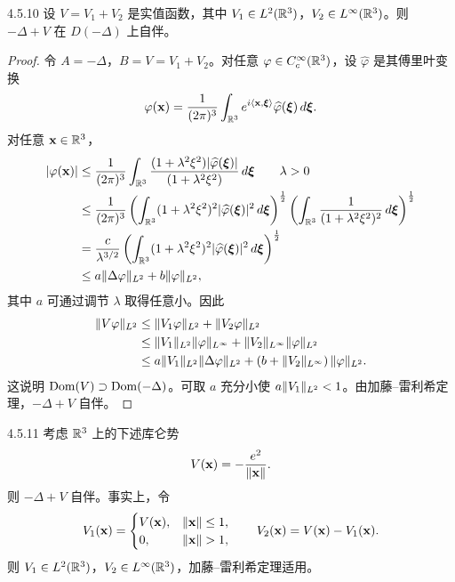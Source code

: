 \begin{proposition}{4.5.10}
  设 $V=V_1+V_2$ 是实值函数，其中 $V_1\in L^2(\mathbb{R}^3)$，$V_2\in L^\infty(\mathbb{R}^3)$。则 $-\Delta+V$ 在 $D(-\Delta)$ 上自伴。
\end{proposition}

\begin{proof}
  令 $A=-\Delta$，$B=V=V_1+V_2$。对任意 $\varphi\in C_c^\infty(\mathbb{R}^3)$，设 $\widehat{\varphi}$ 是其傅里叶变换
  \[
  \varphi(\mathbf{x})=\frac{1}{(2\pi)^3}\int_{\mathbb{R}^3}
  e^{i\langle\mathbf{x},\boldsymbol{\xi}\rangle}\widehat{\varphi}(\boldsymbol{\xi})\,d\boldsymbol{\xi}.
  \]
  对任意 $\mathbf{x}\in\mathbb{R}^3$，
  \begin{align*}
  \lvert \varphi(\mathbf{x})\rvert
  &\le\frac{1}{(2\pi)^3}\int_{\mathbb{R}^3}
  \frac{(1+\lambda^2\xi^2)\lvert \widehat{\varphi}(\boldsymbol{\xi})\rvert}{(1+\lambda^2\xi^2)}\,d\boldsymbol{\xi}
  \qquad\lambda>0\\
  &\le\frac{1}{(2\pi)^3}
  \left(\int_{\mathbb{R}^3}(1+\lambda^2\xi^2)^2\lvert \widehat{\varphi}(\boldsymbol{\xi})\rvert^2\,d\boldsymbol{\xi}\right)^{\frac12}
  \left(\int_{\mathbb{R}^3}\frac{1}{(1+\lambda^2\xi^2)^2}\,d\boldsymbol{\xi}\right)^{\frac12}\\
  &=\frac{c}{\lambda^{3/2}}
  \left(\int_{\mathbb{R}^3}(1+\lambda^2\xi^2)^2\lvert \widehat{\varphi}(\boldsymbol{\xi})\rvert^2\,d\boldsymbol{\xi}\right)^{\frac12}\\
  &\le a\lVert \Delta\varphi\rVert_{L^2}+b\lVert \varphi\rVert_{L^2},
  \end{align*}
  其中 $a$ 可通过调节 $\lambda$ 取得任意小。因此
  \begin{align*}
  \lVert V\varphi\rVert_{L^2}
  &\le\lVert V_1\varphi\rVert_{L^2}+\lVert V_2\varphi\rVert_{L^2}\\
  &\le\lVert V_1\rVert_{L^2}\lVert \varphi\rVert_{L^\infty}+\lVert V_2\rVert_{L^\infty}\lVert \varphi\rVert_{L^2}\\
  &\le a\lVert V_1\rVert_{L^2}\lVert \Delta\varphi\rVert_{L^2}
  +\left(b+\lVert V_2\rVert_{L^\infty}\right)\lVert \varphi\rVert_{L^2}.
  \end{align*}
  这说明 $\operatorname{Dom}(V)\supset\operatorname{Dom}(-\Delta)$。可取 $a$ 充分小使 $a\lVert V_1\rVert_{L^2}<1$。由加藤–雷利希定理，$-\Delta+V$ 自伴。
\end{proof}

\begin{example}{4.5.11}
  考虑 $\mathbb{R}^3$ 上的下述库仑势
  \[
  V(\mathbf{x})=-\frac{e^2}{\lVert \mathbf{x}\rVert}.
  \]
  则 $-\Delta+V$ 自伴。事实上，令
  \[
  V_1(\mathbf{x})=\begin{cases}
  V(\mathbf{x}),&\lVert \mathbf{x}\rVert\le1,\\
  0,&\lVert \mathbf{x}\rVert>1,
  \end{cases}
  \qquad V_2(\mathbf{x})=V(\mathbf{x})-V_1(\mathbf{x}).
  \]
  则 $V_1\in L^2(\mathbb{R}^3)$，$V_2\in L^\infty(\mathbb{R}^3)$，加藤–雷利希定理适用。
\end{example}

